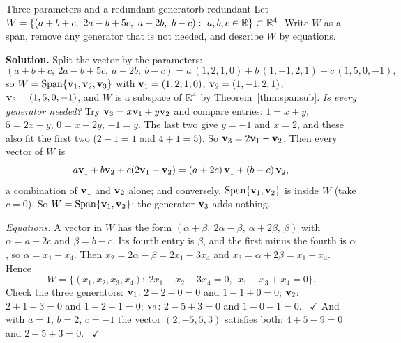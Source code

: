 \documentclass[11pt]{article}
\begin{document}
\begin{exmp}{Three parameters and a redundant generator}{b-redundant}
Let $W=\{(a+b+c,\ 2a-b+5c,\ a+2b,\ b-c):\ a,b,c\in\R\}\subset\R^4$. Write $W$ as a span, remove any generator that is not needed, and describe $W$ by equations.

\textbf{Solution.} Split the vector by the parameters:
\[
(a+b+c,\ 2a-b+5c,\ a+2b,\ b-c)=a\,(1,2,1,0)+b\,(1,-1,2,1)+c\,(1,5,0,-1),
\]
so $W=\operatorname{Span}\{\mathbf{v}_1,\mathbf{v}_2,\mathbf{v}_3\}$ with $\mathbf{v}_1=(1,2,1,0)$, $\mathbf{v}_2=(1,-1,2,1)$, $\mathbf{v}_3=(1,5,0,-1)$, and $W$ is a subspace of $\mathbb{R}^4$ by Theorem~\ref{thm:spansub}. \emph{Is every generator needed?} Try $\mathbf{v}_3=x\mathbf{v}_1+y\mathbf{v}_2$ and compare entries: $1=x+y$, $5=2x-y$, $0=x+2y$, $-1=y$. The last two give $y=-1$ and $x=2$, and these also fit the first two ($2-1=1$ and $4+1=5$). So $\mathbf{v}_3=2\mathbf{v}_1-\mathbf{v}_2$. Then every vector of $W$ is
\[
a\mathbf{v}_1+b\mathbf{v}_2+c(2\mathbf{v}_1-\mathbf{v}_2)=(a+2c)\,\mathbf{v}_1+(b-c)\,\mathbf{v}_2,
\]
a combination of $\mathbf{v}_1$ and $\mathbf{v}_2$ alone; and conversely, $\operatorname{Span}\{\mathbf{v}_1,\mathbf{v}_2\}$ is inside $W$ (take $c=0$). So $W=\operatorname{Span}\{\mathbf{v}_1,\mathbf{v}_2\}$: the generator $\mathbf{v}_3$ adds nothing.

\emph{Equations.} A vector in $W$ has the form $(\alpha+\beta,\ 2\alpha-\beta,\ \alpha+2\beta,\ \beta)$ with $\alpha=a+2c$ and $\beta=b-c$. Its fourth entry is $\beta$, and the first minus the fourth is $\alpha$, so $\alpha=x_1-x_4$. Then $x_2=2\alpha-\beta=2x_1-3x_4$ and $x_3=\alpha+2\beta=x_1+x_4$. Hence
\[
W=\{(x_1,x_2,x_3,x_4):\ 2x_1-x_2-3x_4=0,\ \ x_1-x_3+x_4=0\}.
\]
Check the three generators: $\mathbf{v}_1$: $2-2-0=0$ and $1-1+0=0$; $\mathbf{v}_2$: $2+1-3=0$ and $1-2+1=0$; $\mathbf{v}_3$: $2-5+3=0$ and $1-0-1=0$. \ $\checkmark$ And with $a=1$, $b=2$, $c=-1$ the vector $(2,-5,5,3)$ satisfies both: $4+5-9=0$ and $2-5+3=0$. \ $\checkmark$
\end{exmp}
\end{document}
